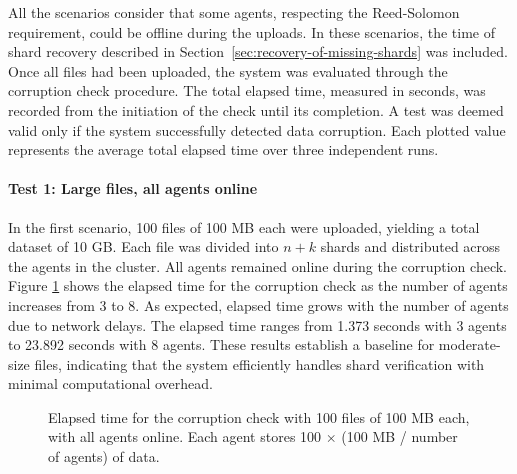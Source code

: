 All the scenarios consider that some agents, respecting the Reed-Solomon
requirement, could be offline during the uploads. In these scenarios, the time
of shard recovery described in Section~\ref{sec:recovery-of-missing-shards} was
included. Once all files had been uploaded, the system was evaluated through the
corruption check procedure. The total elapsed time, measured in seconds, was
recorded from the initiation of the check until its completion. A test was
deemed valid only if the system successfully detected data corruption. Each plotted value represents the average total elapsed time over three independent runs.

\paragraph{Test 1: Large files, all agents online}

In the first scenario, 100 files of 100 MB each were uploaded, yielding a total
dataset of 10 GB. Each file was divided into $n+k$ shards and distributed across
the agents in the cluster. All agents remained online during the corruption
check. Figure \ref{fig:test-1} shows the elapsed time for the corruption check
as the number of agents increases from 3 to 8. As expected, elapsed time grows
with the number of agents due to network delays. The elapsed time ranges from 1.373 seconds with 3 agents to 23.892 seconds with 8 agents. These results establish a baseline for moderate-size files, indicating that the system efficiently handles shard verification with minimal computational overhead.

\begin{figure}[!ht]
\centering
{}
\caption{Elapsed time for the corruption check with 100 files of 100 MB each,
    with all agents online. Each agent stores 100 $\times$ (100 MB / number of agents) of data.}
\label{fig:test-1}
\end{figure}


